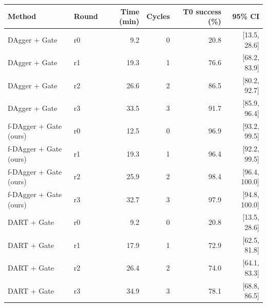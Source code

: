 \begin{tabular}{llrrrr}
\toprule
Method & Round & Time (min) & Cycles & T0 success (\%) & 95\% CI \\
\midrule
DAgger + Gate & r0 & 9.2 & 0 & 20.8 & [13.5, 28.6] \\
DAgger + Gate & r1 & 19.3 & 1 & 76.6 & [68.2, 83.9] \\
DAgger + Gate & r2 & 26.6 & 2 & 86.5 & [80.2, 92.7] \\
DAgger + Gate & r3 & 33.5 & 3 & 91.7 & [85.9, 96.4] \\
\midrule
f-DAgger + Gate (ours) & r0 & 12.5 & 0 & 96.9 & [93.2, 99.5] \\
f-DAgger + Gate (ours) & r1 & 19.3 & 1 & 96.4 & [92.2, 99.5] \\
f-DAgger + Gate (ours) & r2 & 25.9 & 2 & 98.4 & [96.4, 100.0] \\
f-DAgger + Gate (ours) & r3 & 32.7 & 3 & 97.9 & [94.8, 100.0] \\
\midrule
DART + Gate & r0 & 9.2 & 0 & 20.8 & [13.5, 28.6] \\
DART + Gate & r1 & 17.9 & 1 & 72.9 & [62.5, 81.8] \\
DART + Gate & r2 & 26.4 & 2 & 74.0 & [64.1, 83.3] \\
DART + Gate & r3 & 34.9 & 3 & 78.1 & [68.8, 86.5] \\
\bottomrule
\end{tabular}
